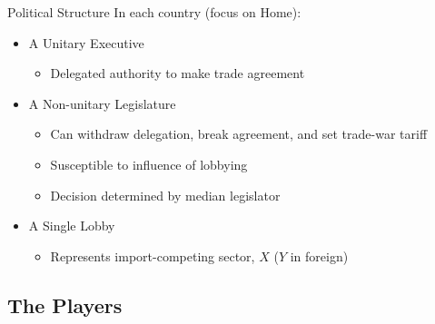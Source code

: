 \documentclass[handout]{beamer}
\newcommand{\ga}{\gamma}
\begin{document}
\begin{frame}{Political Structure}
In each country (focus on Home):
\pause
\begin{itemize}[<+->]
	\item A Unitary Executive
		\begin{itemize}
			\item Delegated authority to make trade agreement
		\end{itemize}
	\item A Non-unitary Legislature
		\begin{itemize}[<+->]
			\item Can withdraw delegation, break agreement, and set trade-war tariff
			\item Susceptible to influence of lobbying
			\item Decision determined by median legislator
		\end{itemize}
	\item A Single Lobby
		\begin{itemize}
			\item Represents import-competing sector, $X$ ($Y$ in foreign)
		\end{itemize}	
\end{itemize}

\end{frame}


\subsection{The Players}
\end{document}
